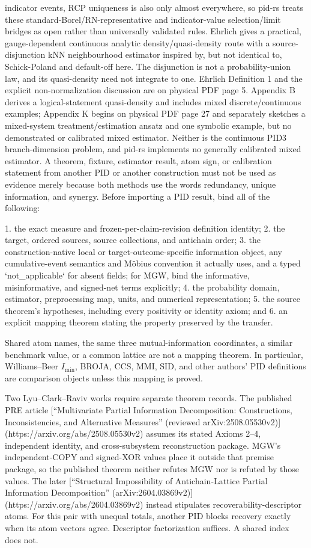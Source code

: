 \documentclass[11pt]{article}
\begin{document}
\begin{markdown}
indicator events, RCP uniqueness is
also only almost everywhere, so
pid-rs treats these standard-Borel/RN-representative and indicator-value selection/limit bridges as
open rather than universally validated rules. Ehrlich gives a practical, gauge-dependent
continuous analytic density/quasi-density route with a source-disjunction kNN neighbourhood
estimator inspired by, but not identical to, Schick-Poland and default-off here. The disjunction
is not a probability-union law, and its quasi-density need not integrate to one. Ehrlich Definition
1 and the explicit non-normalization discussion are on physical PDF page 5. Appendix B derives a
logical-statement quasi-density and includes mixed discrete/continuous examples; Appendix K begins
on physical PDF page 27 and separately sketches a mixed-system treatment/estimation ansatz and one
symbolic example, but no demonstrated or calibrated mixed estimator. Neither is the continuous PID3
branch-dimension problem, and pid-rs implements no generally calibrated mixed estimator. A theorem, fixture, estimator result,
atom sign, or calibration statement from another PID or another construction must not be used as
evidence merely because both methods use the words redundancy, unique information, and synergy.
Before importing a PID result, bind all of the following:

1. the exact measure and frozen-per-claim-revision definition identity;
2. the target, ordered sources, source collections, and antichain order;
3. the construction-native local or target-outcome-specific information object, any cumulative-event
   semantics and Möbius convention it actually uses, and a typed `not_applicable` for absent fields;
   for MGW, bind the informative, misinformative, and signed-net terms explicitly;
4. the probability domain, estimator, preprocessing map, units, and numerical representation;
5. the source theorem's hypotheses, including every positivity or identity axiom; and
6. an explicit mapping theorem stating the property preserved by the transfer.

Shared atom names, the same three mutual-information coordinates, a similar benchmark value, or a
common lattice are not a mapping theorem. In particular, Williams--Beer $I_{\min}$, BROJA, CCS,
MMI, SID, and other authors' PID definitions are comparison objects unless this mapping is proved.

Two Lyu--Clark--Raviv works require separate theorem records. The published PRE article
[“Multivariate Partial Information Decomposition: Constructions, Inconsistencies, and Alternative
Measures” (reviewed arXiv:2508.05530v2)](https://arxiv.org/abs/2508.05530v2) assumes its stated
Axioms 2--4, independent identity, and cross-subsystem reconstruction package. MGW's
independent-COPY and signed-XOR values place it outside that premise package, so the published
theorem neither refutes MGW nor is refuted by those values. The later
[“Structural Impossibility of Antichain-Lattice Partial Information Decomposition”
(arXiv:2604.03869v2)](https://arxiv.org/abs/2604.03869v2) instead stipulates
recoverability-descriptor atoms. For this pair with unequal totals, another PID blocks recovery
exactly when its atom vectors agree. Descriptor factorization suffices. A shared index does not.


\end{markdown}
\end{document}
